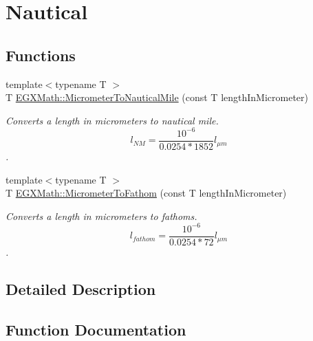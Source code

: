 \hypertarget{group___e_g_x_math-_conversions-_length_conversions-_s_i-_micrometer-_nautical}{}\section{Nautical}
\label{group___e_g_x_math-_conversions-_length_conversions-_s_i-_micrometer-_nautical}
\subsection*{Functions}
\begin{DoxyCompactItemize}
\item 
{\footnotesize template$<$typename T $>$ }\\T \mbox{\hyperlink{group___e_g_x_math-_conversions-_length_conversions-_s_i-_micrometer-_nautical_ga43c5eb76a19baf316e06b38781369157}{E\+G\+X\+Math\+::\+Micrometer\+To\+Nautical\+Mile}} (const T length\+In\+Micrometer)
\begin{DoxyCompactList}\small\item\em Converts a length in micrometers to nautical mile. \[ l_{NM}= \frac{10^{-6}}{0.0254 * 1852} l_{\mu m} \]. \end{DoxyCompactList}\item 
{\footnotesize template$<$typename T $>$ }\\T \mbox{\hyperlink{group___e_g_x_math-_conversions-_length_conversions-_s_i-_micrometer-_nautical_gad7205d8bf0d8735b12fc0b03c67cf0f7}{E\+G\+X\+Math\+::\+Micrometer\+To\+Fathom}} (const T length\+In\+Micrometer)
\begin{DoxyCompactList}\small\item\em Converts a length in micrometers to fathoms. \[ l_{fathom}= \frac{10^{-6}}{0.0254 * 72} l_{\mu m} \]. \end{DoxyCompactList}\end{DoxyCompactItemize}


\subsection{Detailed Description}


\subsection{Function Documentation}
\mbox{\label{group___e_g_x_math-_conversions-_length_conversions-_s_i-_micrometer-_nautical_gad7205d8bf0d8735b12fc0b03c67cf0f7}} 
